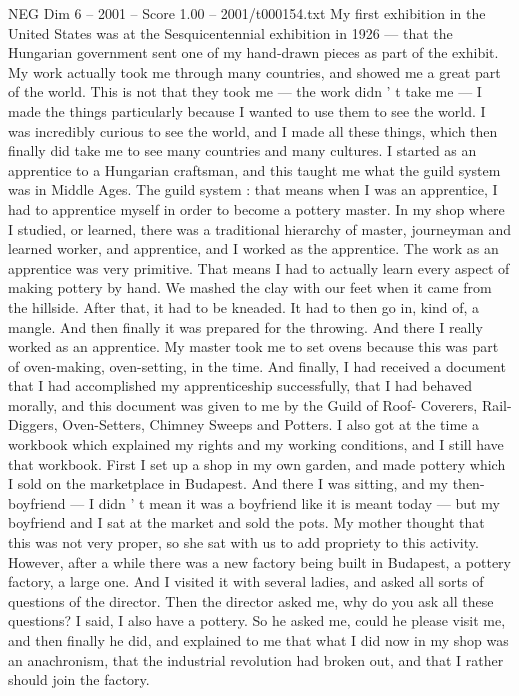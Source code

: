 \begin{textsample}{NEG Dim 6 – 2001 – Score 1.00 – 2001/t000154.txt}
My first exhibition in the United States was at the Sesquicentennial exhibition in 1926 — that the Hungarian government sent one of my hand-drawn pieces as part of the exhibit.
My work actually took me through many countries, and showed me a great part of the world.
This is not that they took me — the work didn ' t take me — I made the things particularly because I wanted to use them to see the world.
I was incredibly curious to see the world, and I made all these things, which then finally did take me to see many countries and many cultures.
I started as an apprentice to a Hungarian craftsman, and this taught me what the guild system was in Middle Ages.
The guild system : that means when I was an apprentice, I had to apprentice myself in order to become a pottery master.
In my shop where I studied, or learned, there was a traditional hierarchy of master, journeyman and learned worker, and apprentice, and I worked as the apprentice.
The work as an apprentice was very primitive.
That means I had to actually learn every aspect of making pottery by hand.
We mashed the clay with our feet when it came from the hillside.
After that, it had to be kneaded.
It had to then go in, kind of, a mangle.
And then finally it was prepared for the throwing.
And there I really worked as an apprentice.
My master took me to set ovens because this was part of oven-making, oven-setting, in the time.
And finally, I had received a document that I had accomplished my apprenticeship successfully, that I had behaved morally, and this document was given to me by the Guild of Roof- Coverers, Rail-Diggers, Oven-Setters, Chimney Sweeps and Potters.
I also got at the time a workbook which explained my rights and my working conditions, and I still have that workbook.
First I set up a shop in my own garden, and made pottery which I sold on the marketplace in Budapest.
And there I was sitting, and my then-boyfriend — I didn ' t mean it was a boyfriend like it is meant today — but my boyfriend and I sat at the market and sold the pots.
My mother thought that this was not very proper, so she sat with us to add propriety to this activity.
However, after a while there was a new factory being built in Budapest, a pottery factory, a large one.
And I visited it with several ladies, and asked all sorts of questions of the director.
Then the director asked me, why do you ask all these questions?
I said, I also have a pottery.
So he asked me, could he please visit me, and then finally he did, and explained to me that what I did now in my shop was an anachronism, that the industrial revolution had broken out, and that I rather should join the factory.

\end{textsample}
